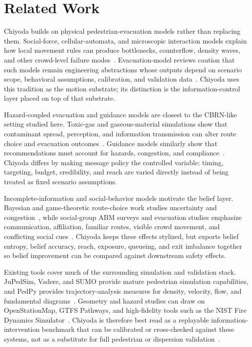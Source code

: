 \section{Related Work}
\label{sec:related}

Chiyoda builds on physical pedestrian-evacuation models rather than replacing
them. Social-force, cellular-automata, and microscopic interaction models
explain how local movement rules can produce bottlenecks, counterflow, density
waves, and other crowd-level failure modes~\cite{helbing1995social,
burstedde2001simulation,moussaid2011simple}. Evacuation-model reviews caution
that such models remain engineering abstractions whose outputs depend on
scenario scope, behavioral assumptions, calibration, and validation
data~\cite{gwynne1999review,schadschneider2009evacuation}. Chiyoda uses this
tradition as the motion substrate; its distinction is the information-control
layer placed on top of that substrate.

Hazard-coupled evacuation and guidance models are closest to the CBRN-like
setting studied here. Toxic-gas and gaseous-material simulations show that
contaminant spread, perception, and information transmission can alter route
choice and evacuation outcomes~\cite{makmul2020cellular,liu2021toxicgas}.
Guidance models similarly show that recommendations must account for hazards,
congestion, and compliance~\cite{chu2017variable}. Chiyoda differs by making
message policy the controlled variable: timing, targeting, budget, credibility,
and reach are varied directly instead of being treated as fixed scenario
assumptions.

Incomplete-information and social-behavior models motivate the belief layer.
Bayesian and game-theoretic route-choice work studies uncertainty and
congestion~\cite{hoogendoorn2004routechoice,wang2023bayesian}, while
social-group ABM surveys and evacuation studies emphasize communication,
affiliation, familiar routes, visible crowd movement, and conflicting social
cues~\cite{templeton2023social,senanayake2024agent,sime1983affiliative,
kobes2010building,bode2013human,kinateder2014social}. Chiyoda keeps these
effects stylized, but exports belief entropy, belief accuracy, reach, exposure,
queueing, and exit imbalance together so belief improvement can be compared
against downstream safety effects.

Existing tools cover much of the surrounding simulation and validation stack.
JuPedSim, Vadere, and SUMO provide mature pedestrian simulation capabilities,
and PedPy provides trajectory-analysis measures for density, velocity, flow,
and fundamental diagrams~\cite{kemlohwagoum2015jupedsim,kleinmeier2019vadere,
alvarezlopez2018sumo,schrodter2025pedpy}. Geometry and hazard studies can draw
on OpenStationMap, GTFS Pathways, and high-fidelity tools such as the NIST Fire
Dynamics Simulator~\cite{openstationmap2026,gtfs2026pathways,mcgrattan2013fds}.
Chiyoda is therefore best read as a replayable information-intervention
benchmark that can be calibrated or cross-checked against these systems, not as
a substitute for full pedestrian or dispersion validation~\cite{ronchi2013verification}.

